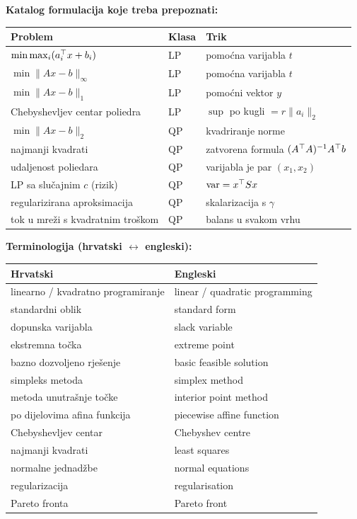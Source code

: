 \textbf{Katalog formulacija koje treba prepoznati:}

\begin{center}
\begin{tabular}{P{6.6cm}P{2.0cm}P{4.2cm}}
\toprule
\textbf{Problem} & \textbf{Klasa} & \textbf{Trik} \\
\midrule
$\min\max_i (a_i^{\top} x + b_i)$ & LP & pomoćna varijabla $t$ \\
$\min\|Ax-b\|_\infty$ & LP & pomoćna varijabla $t$ \\
$\min\|Ax-b\|_1$ & LP & pomoćni vektor $y$ \\
Chebyshevljev centar poliedra & LP & $\sup$ po kugli $= r\|a_i\|_2$ \\
$\min\|Ax-b\|_2$ & QP & kvadriranje norme \\
najmanji kvadrati & QP & zatvorena formula $(A^{\top} A)^{-1}A^{\top} b$ \\
udaljenost poliedara & QP & varijabla je par $(x_1,x_2)$ \\
LP sa slučajnim $c$ (rizik) & QP & $\operatorname{var} = x^{\top} Sx$ \\
regularizirana aproksimacija & QP & skalarizacija s $\gamma$ \\
tok u mreži s kvadratnim troškom & QP & balans u svakom vrhu \\
\bottomrule
\end{tabular}
\end{center}

\textbf{Terminologija (hrvatski $\leftrightarrow$ engleski):}

\begin{center}
\begin{tabular}{ll}
\toprule
\textbf{Hrvatski} & \textbf{Engleski} \\
\midrule
linearno / kvadratno programiranje & linear / quadratic programming \\
standardni oblik & standard form \\
dopunska varijabla & slack variable \\
ekstremna točka & extreme point \\
bazno dozvoljeno rješenje & basic feasible solution \\
simpleks metoda & simplex method \\
metoda unutrašnje točke & interior point method \\
po dijelovima afina funkcija & piecewise affine function \\
Chebyshevljev centar & Chebyshev centre \\
najmanji kvadrati & least squares \\
normalne jednadžbe & normal equations \\
regularizacija & regularisation \\
Pareto fronta & Pareto front \\
\bottomrule
\end{tabular}
\end{center}
